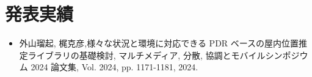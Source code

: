 
\chapter*{発表実績}

\begin{itemize}
\item 外山瑠起, 梶克彦,様々な状況と環境に対応できる PDR ベースの屋内位置推定ライブラリの基礎検討, マルチメディア, 分散, 協調とモバイルシンポジウム 2024 論文集, Vol. 2024, pp. 1171-1181, 2024.
\end{itemize}
